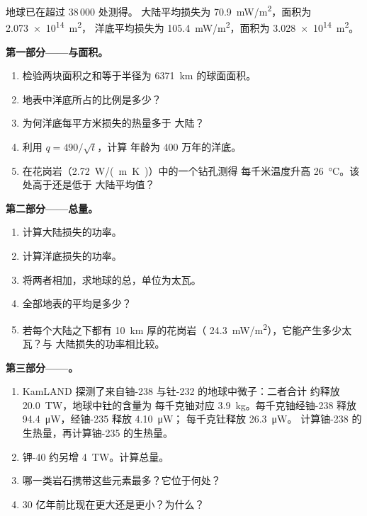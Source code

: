 \begin{problem}
\label{pb:g12:internal-heat:1}
地球已在超过 38\,000 处测得。
大陆平均损失为 \qty{70.9}{mW/m^2}，面积为 \qty{2.073e14}{m^2}，
洋底平均损失为 \qty{105.4}{mW/m^2}，面积为 \qty{3.028e14}{m^2}。

\medskip
\noindent\textbf{第一部分——与面积。}
\begin{enumerate}
  \item 检验两块面积之和等于半径为
        \qty{6371}{km} 的球面面积。
  \item 地表中洋底所占的比例是多少？
  \item 为何洋底每平方米损失的热量多于
        大陆？
  \item 利用 $q = 490/\sqrt{t}$，计算
        年龄为 400 万年的洋底。
  \item 在花岗岩（\qty{2.72}{W/(m.K)}）中的一个钻孔测得
        每千米温度升高 \qty{26}{\celsius}。该处高于还是低于
        大陆平均值？
\end{enumerate}

\medskip
\noindent\textbf{第二部分——总量。}
\begin{enumerate}[resume]
  \item 计算大陆损失的功率。
  \item 计算洋底损失的功率。
  \item 将两者相加，求地球的总，单位为太瓦。
  \item 全部地表的平均是多少？
  \item 若每个大陆之下都有 \qty{10}{km} 厚的花岗岩（
        \qty{24.3}{mW/m^2}），它能产生多少太瓦？与
        大陆损失的功率相比较。
\end{enumerate}

\medskip
\noindent\textbf{第三部分——。}
\begin{enumerate}[resume]
  \item KamLAND 探测了来自铀-238 与钍-232 的地球中微子：二者合计
        约释放 \qty{20.0}{TW}，地球中钍的含量为
        每千克铀对应 \qty{3.9}{kg}。每千克铀经铀-238 释放
        \qty{94.4}{\micro W}，经铀-235 释放 \qty{4.10}{\micro W}；
        每千克钍释放 \qty{26.3}{\micro W}。
        计算铀-238 的生热量，再计算铀-235 的生热量。
  \item 钾-40 约另增 \qty{4}{TW}。计算总量。
  \item 哪一类岩石携带这些元素最多？它位于何处？
  \item 30 亿年前比现在更大还是更小？为什么？
\end{enumerate}


\end{problem}
